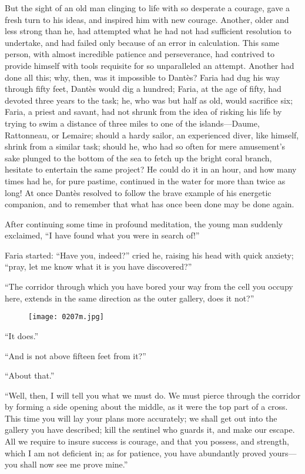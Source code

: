 But the sight of an old man clinging to life with so desperate a
courage, gave a fresh turn to his ideas, and inspired him with new
courage. Another, older and less strong than he, had attempted what he
had not had sufficient resolution to undertake, and had failed only
because of an error in calculation. This same person, with almost
incredible patience and perseverance, had contrived to provide himself
with tools requisite for so unparalleled an attempt. Another had done
all this; why, then, was it impossible to Dantès? Faria had dug his way
through fifty feet, Dantès would dig a hundred; Faria, at the age of
fifty, had devoted three years to the task; he, who was but half as
old, would sacrifice six; Faria, a priest and savant, had not shrunk
from the idea of risking his life by trying to swim a distance of three
miles to one of the islands—Daume, Rattonneau, or Lemaire; should a
hardy sailor, an experienced diver, like himself, shrink from a similar
task; should he, who had so often for mere amusement’s sake plunged to
the bottom of the sea to fetch up the bright coral branch, hesitate to
entertain the same project? He could do it in an hour, and how many
times had he, for pure pastime, continued in the water for more than
twice as long! At once Dantès resolved to follow the brave example of
his energetic companion, and to remember that what has once been done
may be done again.

After continuing some time in profound meditation, the young man
suddenly exclaimed, “I have found what you were in search of!”

Faria started: “Have you, indeed?” cried he, raising his head with
quick anxiety; “pray, let me know what it is you have discovered?”

“The corridor through which you have bored your way from the cell you
occupy here, extends in the same direction as the outer gallery, does
it not?”

\begin{figure}[ht]
\texttt{[image: 0207m.jpg]}
\end{figure}

“It does.”

“And is not above fifteen feet from it?”

“About that.”

“Well, then, I will tell you what we must do. We must pierce through
the corridor by forming a side opening about the middle, as it were the
top part of a cross. This time you will lay your plans more accurately;
we shall get out into the gallery you have described; kill the sentinel
who guards it, and make our escape. All we require to insure success is
courage, and that you possess, and strength, which I am not deficient
in; as for patience, you have abundantly proved yours—you shall now see
me prove mine.”

